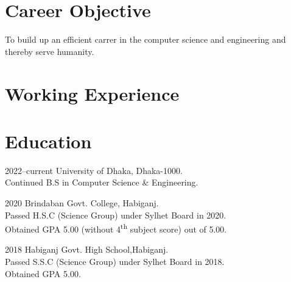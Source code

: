 \documentclass[a4paper]{article}
\begin{document}
\section{Career Objective}
\begin{CV}
\item To build up an efficient carrer in the computer science and engineering and thereby serve humanity.
  \end{CV}

\section{Working Experience}

\begin{CV}

\end{CV}


\section{Education}

\begin{CV}
\item[2022--current] University of Dhaka, Dhaka-1000.\\Continued  B.S in Computer Science \& Engineering.%
\item[2020] Brindaban Govt. College, Habiganj.\\Passed H.S.C (Science Group) under Sylhet Board in 2020.\\Obtained GPA 5.00 (without 4\textsuperscript{th} subject score) out of 5.00.
\item[2018] Habiganj Govt. High School,Habiganj.\\Passed S.S.C (Science Group) under Sylhet Board in 2018.\\Obtained GPA 5.00. %
\end{CV}
\end{document}
